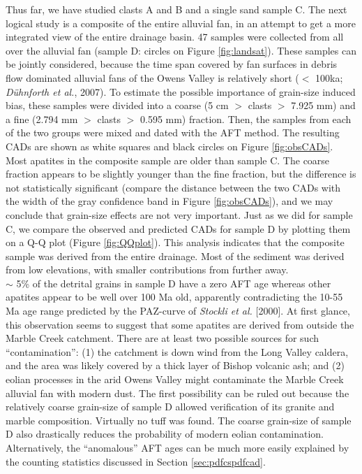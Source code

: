 \documentclass[12pt,twoside]{article}
\begin{document}
Thus far, we have  studied clasts A and B and a  single sand sample C. 
The next logical  study is a composite of the  entire alluvial fan, in
an attempt to get a more integrated view of the entire drainage basin.
47 samples  were collected from all  over the alluvial  fan (sample D:
circles on  Figure \ref{fig:landsat}).   These samples can  be jointly
considered, because  the time span  covered by fan surfaces  in debris
flow dominated alluvial  fans of the Owens Valley  is relatively short
($<$  100ka;  {\it D\"{u}hnforth  et  al.},  2007).   To estimate  the
possible  importance of  grain-size induced  bias, these  samples were
divided into a coarse (5 cm $>$ clasts $>$ 7.925 mm) and a fine (2.794
mm $>$ clasts $>$ 0.595 mm)  fraction.  Then, the samples from each of
the  two  groups  were mixed  and  dated  with  the AFT  method.   The
resulting CADs are shown as  white squares and black circles on Figure
\ref{fig:obsCADs}.  Most  apatites in  the composite sample  are older
than sample  C.  The  coarse fraction appears  to be  slightly younger
than  the  fine fraction,  but  the  difference  is not  statistically
significant (compare the distance between  the two CADs with the width
of the gray  confidence band in Figure \ref{fig:obsCADs}),  and we may
conclude that grain-size  effects are not very important.   Just as we
did  for sample  C, we  compare the  observed and  predicted  CADs for
sample D  by plotting  them on a  Q-Q plot (Figure  \ref{fig:QQplot}). 
This analysis indicates that the composite sample was derived from the
entire  drainage.    Most  of  the  sediment  was   derived  from  low
elevations, with smaller contributions from further away.
\\

$\sim$ 5\%  of the  detrital grains in  sample D  have a zero  AFT age
whereas other apatites  appear to be well over  100 Ma old, apparently
contradicting the  10-55 Ma  age range predicted  by the  PAZ-curve of
{\it Stockli et al.}  [2000].  At first glance, this observation seems
to  suggest that  some apatites  are derived  from outside  the Marble
Creek catchment.   There are  at least two  possible sources  for such
``contamination'': (1) the catchment is down wind from the Long Valley
caldera, and  the area was likely  covered by a thick  layer of Bishop
volcanic ash; and (2) eolian  processes in the arid Owens Valley might
contaminate the Marble Creek alluvial fan with modern dust.  The first
possibility can be ruled  out because the relatively coarse grain-size
of  sample   D  allowed  verification   of  its  granite   and  marble
composition. Virtually  no tuff was  found.  The coarse  grain-size of
sample  D also drastically  reduces the  probability of  modern eolian
contamination.  Alternatively, the ``anomalous''  AFT ages can be much
more easily explained by  the counting statistics discussed in Section
\ref{sec:pdfcspdfcad}.
\\
\end{document}
